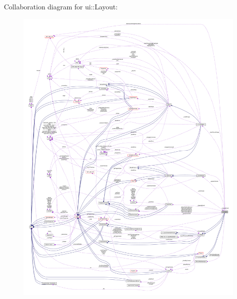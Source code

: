 Collaboration diagram for ui\+:\+:Layout\+:
\nopagebreak
\begin{figure}[H]
\begin{center}
\leavevmode
\includegraphics[width=350pt]{classui_1_1Layout__coll__graph}
\end{center}
\end{figure}
